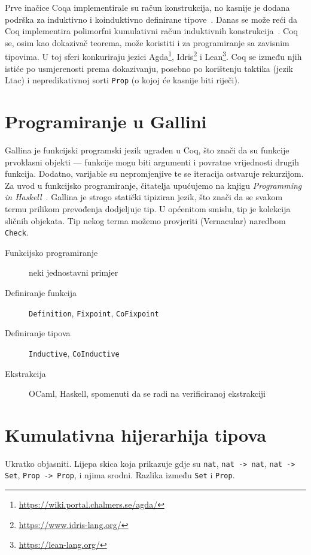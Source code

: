 Prve inačice Coqa implementirale su račun konstrukcija, no kasnije je dodana podrška za induktivno i koinduktivno definirane tipove~\cite{cic, coinductive}.
Danas se može reći da Coq implementira polimorfni kumulativni račun induktivnih konstrukcija~\cite{coqcoqcorrect}.
Coq se, osim kao dokazivač teorema, može koristiti i za programiranje sa zavisnim tipovima.
U toj sferi konkuriraju jezici Agda\footnote{\url{https://wiki.portal.chalmers.se/agda/}}, Idris\footnote{\url{https://www.idris-lang.org/}} i Lean\footnote{\url{https://lean-lang.org/}}. Coq se između njih istiće po usmjerenosti prema dokazivanju, posebno po korištenju taktika (jezik Ltac) i nepredikativnoj sorti \texttt{Prop} (o kojoj će kasnije biti riječi).

\section{Programiranje u Gallini}\label{sec:programiranje-u-gallini}
Gallina je funkcijski programski jezik ugrađen u Coq, što znači da su funkcije prvoklasni objekti ---
funkcije mogu biti argumenti i povratne vrijednosti drugih funkcija.
Dodatno, varijable su nepromjenjive  te se iteracija ostvaruje rekurzijom.
Za uvod u funkcijsko programiranje, čitatelja upućujemo na knjigu \textit{Programming in Haskell}~\cite{Hutton_2016}.
Gallina je strogo statički tipiziran jezik, što znači da se svakom termu prilikom prevođenja dodjeljuje tip.
U općenitom smislu, tip je kolekcija sličnih objekata. 
Tip nekog terma možemo provjeriti (Vernacular) naredbom \texttt{Check}.
\begin{description}
\item[Funkcijsko programiranje] neki jednostavni primjer
\item[Definiranje funkcija] \texttt{Definition}, \texttt{Fixpoint}, \texttt{CoFixpoint}
\item[Definiranje tipova] \texttt{Inductive}, \texttt{CoInductive}
\item[Ekstrakcija] OCaml, Haskell, spomenuti da se radi na verificiranoj ekstrakciji
\end{description}
\section{Kumulativna hijerarhija tipova}\label{sec:kumul-hijer-tipova}
Ukratko objasniti. Lijepa skica koja prikazuje gdje su \texttt{nat}, \texttt{nat -> nat}, \texttt{nat -> Set}, \texttt{Prop -> Prop}, i njima srodni. Razlika između \texttt{Set} i \texttt{Prop}.

